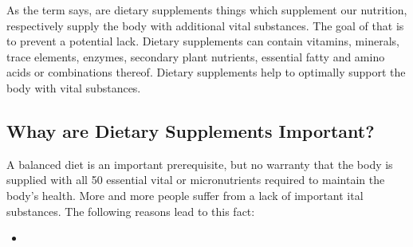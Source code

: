 \documentclass[../main.tex]{subfiles}
\begin{document}
As the term says, are dietary supplements things which supplement our nutrition,
respectively supply the body with additional vital substances.
The goal of that is to prevent a potential lack.
Dietary supplements can contain vitamins, minerals, trace elements, enzymes, secondary plant nutrients,
essential fatty and amino acids or combinations thereof.
Dietary supplements help to optimally support the body with vital substances.

\subsection{Whay are Dietary Supplements Important?}
A balanced diet is an important prerequisite, but no warranty that the body is supplied with all 50
essential vital or micronutrients required to maintain the body's health.
More and more people suffer from a lack of important ital substances.
The following reasons lead to this fact:
\begin{itemize}
\item 
\end{itemize}
\end{document}
